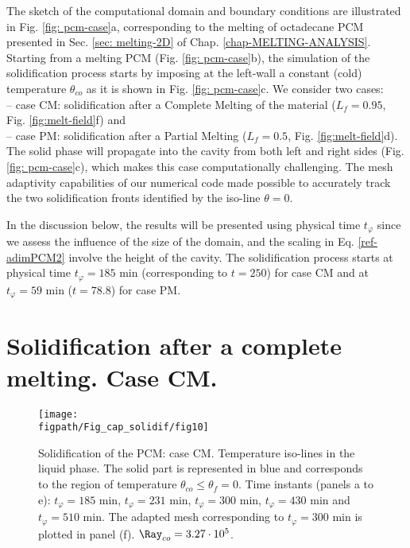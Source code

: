 The sketch of the computational domain and boundary conditions are illustrated in Fig. \ref{fig: pcm-case}a, corresponding to the melting of octadecane PCM presented in Sec. \ref{sec: melting-2D} of Chap. \ref{chap-MELTING-ANALYSIS}.
Starting from a melting PCM (Fig. \ref{fig: pcm-case}b), the simulation of the solidification process starts by imposing at the left-wall a constant (cold) temperature $\theta_{co}$ as it is shown in Fig. \ref{fig: pcm-case}c.
We consider two cases: \\ 
-- case CM: solidification after a Complete Melting of the material ($L_f=0.95$, Fig. \ref{fig:melt-field}f) and \\
-- case PM: solidification after a Partial Melting ($L_f=0.5$, Fig. \ref{fig:melt-field}d). \\
 The solid phase will propagate into the cavity from both left and right sides  (Fig. \ref{fig: pcm-case}c), which makes this case computationally challenging. The mesh adaptivity capabilities of our numerical code made possible to accurately track the 
two solidification fronts identified by the iso-line $\theta=0$.  

In the discussion below,  the results will be presented using physical time $t_{\varphi}$ since we assess the influence of the size of the domain, and the scaling in Eq. \ref{ref-adimPCM2} involve the height of the cavity.
The solidification process starts at physical time $t_{\varphi} = 185 $ min (corresponding to $t = 250 $) for case CM and at $t_{\varphi} = 59$ min ($t = 78.8 $) for case PM. 

\newpage
\section{Solidification after a complete melting. Case CM.} \label{sec_solid_full} 

\begin{figure}
	\begin{center}
		\texttt{[image: \\figpath/Fig\_cap\_solidif/fig10]}
	\end{center}
	\caption{Solidification of the PCM: case CM. 
	Temperature iso-lines in the liquid phase. 
	The solid part is represented in blue and corresponds to the region of temperature $\theta_{co} \leq \theta_f=0$. 
	Time instants (panels  a to e): $t_{\varphi} = 185$ min, $t_{\varphi} = 231$ min, $t_{\varphi} = 300$ min, $t_{\varphi} = 430$ min and $t_{\varphi} = 510$ min. 
	The adapted mesh corresponding to $t_{\varphi} = 300$ min is plotted in panel (f).  $\Ray_{co}=3.27 \cdot 10^5$. }\label{fig:evolution}
\end{figure}

